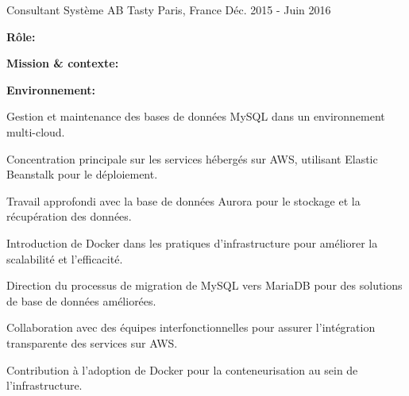 \begin{cventries}
\cventry
{Consultant Système} %
{AB Tasty} %
{Paris, France} %
{Déc. 2015 - Juin 2016} %
{
  \begin{cvitems} %
    \item {\textbf{Rôle:} }
    \item {\textbf{Mission \& contexte:} }
    \item {\textbf{Environnement:} }
    \item {Gestion et maintenance des bases de données MySQL dans un environnement multi-cloud.}
    \item {Concentration principale sur les services hébergés sur AWS, utilisant Elastic Beanstalk pour le déploiement.}
    \item {Travail approfondi avec la base de données Aurora pour le stockage et la récupération des données.}
    \item {Introduction de Docker dans les pratiques d'infrastructure pour améliorer la scalabilité et l'efficacité.}
    \item {Direction du processus de migration de MySQL vers MariaDB pour des solutions de base de données améliorées.}
    \item {Collaboration avec des équipes interfonctionnelles pour assurer l'intégration transparente des services sur AWS.}
    \item {Contribution à l'adoption de Docker pour la conteneurisation au sein de l'infrastructure.}
  \end{cvitems}
}


\end{cventries}
